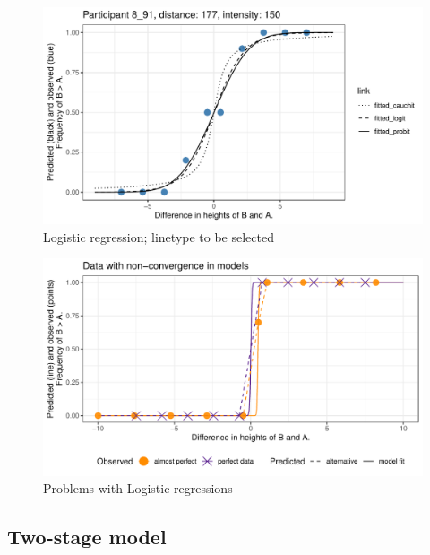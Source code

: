 \begin{knitrout}
\color{fgcolor}\begin{figure}
\includegraphics[width=\maxwidth]{figure/id8-91-1} \caption[Logistic regression]{Logistic regression; linetype to be selected}\label{fig:id8-91}
\end{figure}

\end{knitrout}

\begin{knitrout}
\color{fgcolor}\begin{figure}
\includegraphics[width=\maxwidth]{figure/lr_problems-1} \caption[Problems with Logistic regressions]{Problems with Logistic regressions}\label{fig:lr_problems}
\end{figure}

\end{knitrout}

\subsection{Two-stage model}

